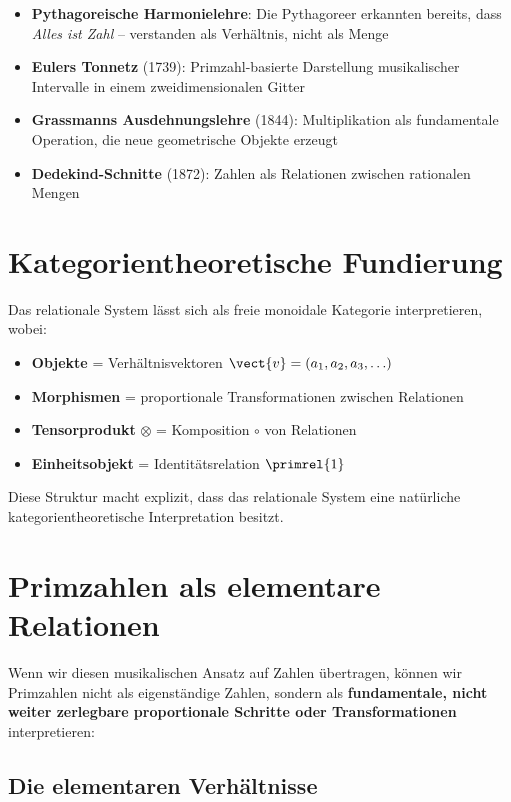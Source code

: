 	\begin{itemize}
		\item \textbf{Pythagoreische Harmonielehre}: Die Pythagoreer erkannten bereits, dass \emph{Alles ist Zahl} -- verstanden als Verhältnis, nicht als Menge
		\item \textbf{Eulers Tonnetz} (1739): Primzahl-basierte Darstellung musikalischer Intervalle in einem zweidimensionalen Gitter
		\item \textbf{Grassmanns Ausdehnungslehre} (1844): Multiplikation als fundamentale Operation, die neue geometrische Objekte erzeugt
		\item \textbf{Dedekind-Schnitte} (1872): Zahlen als Relationen zwischen rationalen Mengen
	\end{itemize}
	
	\section{Kategorientheoretische Fundierung}
	
	\begin{category}
		Das relationale System lässt sich als freie monoidale Kategorie interpretieren, wobei:
		\begin{itemize}
			\item \textbf{Objekte} = Verhältnisvektoren $\vect{v} = (a_1, a_2, a_3, \ldots)$
			\item \textbf{Morphismen} = proportionale Transformationen zwischen Relationen
			\item \textbf{Tensorprodukt} $\otimes$ = Komposition $\circ$ von Relationen
			\item \textbf{Einheitsobjekt} = Identitätsrelation $\primrel{1}$
		\end{itemize}
		
		Diese Struktur macht explizit, dass das relationale System eine natürliche kategorientheoretische Interpretation besitzt.
	\end{category}
	
	\section{Primzahlen als elementare Relationen}
	
	Wenn wir diesen musikalischen Ansatz auf Zahlen übertragen, können wir Primzahlen nicht als eigenständige Zahlen, sondern als \textbf{fundamentale, nicht weiter zerlegbare proportionale Schritte oder Transformationen} interpretieren:
	
	\subsection{Die elementaren Verhältnisse}
	
